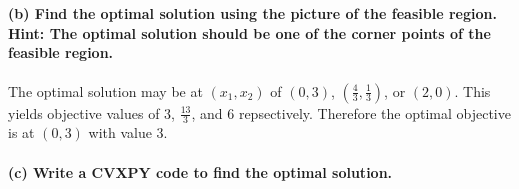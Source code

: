 \documentclass[11pt]{article}
\begin{document}
    \begin{center}
    \end{center}
    { \hspace*{\fill} \\}
    
    \hypertarget{b-find-the-optimal-solution-using-the-picture-of-the-feasible-region.-hint-the-optimal-solution-should-be-one-of-the-corner-points-of-the-feasible-region.}{%
\paragraph{(b) Find the optimal solution using the picture of the
feasible region. Hint: The optimal solution should be one of the corner
points of the feasible
region.}\label{b-find-the-optimal-solution-using-the-picture-of-the-feasible-region.-hint-the-optimal-solution-should-be-one-of-the-corner-points-of-the-feasible-region.}}

The optimal solution may be at \((x_1, x_2)\) of \((0, 3)\),
\((\frac{4}{3}, \frac{1}{3})\), or \((2, 0)\). This yields objective
values of \(3\), \(\frac{13}{3}\), and \(6\) repsectively. Therefore the
optimal objective is at \((0,3)\) with value \(3\).

\hypertarget{c-write-a-cvxpy-code-to-find-the-optimal-solution.}{%
\paragraph{(c) Write a CVXPY code to find the optimal
solution.}\label{c-write-a-cvxpy-code-to-find-the-optimal-solution.}}
\end{document}
